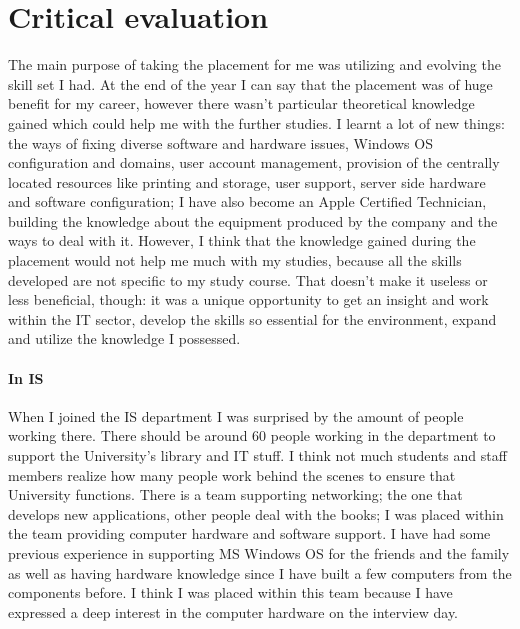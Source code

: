 \documentclass[10pt,a4paper,headinclude=true,twoside]{report}
\begin{document}
\chapter{Critical evaluation}

The main purpose of taking the placement for me was utilizing and evolving the skill set I had. At the end of the year I can say that the placement was of huge benefit for my career, however there wasn't particular theoretical knowledge gained which could help me with the further studies. I learnt a lot of new things: the ways of fixing diverse software and hardware issues, Windows OS configuration and domains, user account management, provision of the centrally located resources like printing and storage, user support, server side hardware and software configuration; I have also become an Apple Certified Technician, building the knowledge about the equipment produced by the company and the ways to deal with it. However, I think that the knowledge gained during the placement would not help me much with my studies, because all the skills developed are not specific to my study course. That doesn't make it useless or less beneficial, though: it was a unique opportunity to get an insight and work within the IT sector, develop the skills so essential for the environment, expand and utilize the knowledge I possessed.
\subsubsection{In IS}
When I joined the IS department I was surprised by the amount of people working there. There should be around 60 people working in the department to support the University's library and IT stuff. I think not much students and staff members realize how many people work behind the scenes to ensure that University functions. There is a team supporting networking; the one that develops new applications, other people deal with the books; I was placed within the team providing computer hardware and software support. I have had some previous experience in supporting MS Windows OS for the friends and the family as well as having hardware knowledge since I have built a few computers from the components before. I think I was placed within this team because I have expressed a deep interest in the computer hardware on the interview day.
\end{document}

